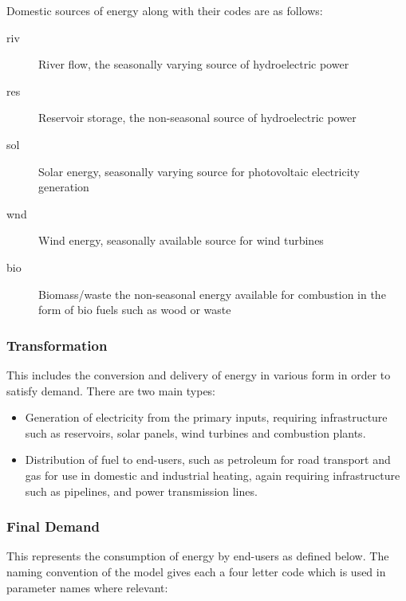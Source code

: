 \documentclass[notitlepage,a4paper]{article}
\begin{document}
Domestic sources of energy along with their codes are as follows:

\begin{description}
\item[riv] River flow, the seasonally varying source of hydroelectric power 
\item[res] Reservoir storage, the non-seasonal source of hydroelectric power
\item[sol] Solar energy, seasonally varying source for photovoltaic electricity generation
\item[wnd] Wind energy, seasonally available source for wind turbines
\item[bio] Biomass/waste the non-seasonal energy available for combustion in the form of bio fuels such as wood or waste
\end{description}


\subsubsection{Transformation}

This includes the conversion and delivery of energy in various form in order to satisfy demand. There are two main types:

\begin{itemize}
\item Generation of electricity from the primary inputs, requiring infrastructure such as reservoirs, solar panels, wind turbines and combustion plants.
\item Distribution of fuel to end-users, such as petroleum for road transport and gas for use in domestic and industrial heating, again requiring infrastructure such as pipelines, and power transmission lines.
\end{itemize}

\subsubsection{Final Demand}
\label{sec:final}

This represents the consumption of energy by end-users as defined below.  The naming convention of the model gives each a four letter code which is used in parameter names where relevant:
\end{document}
